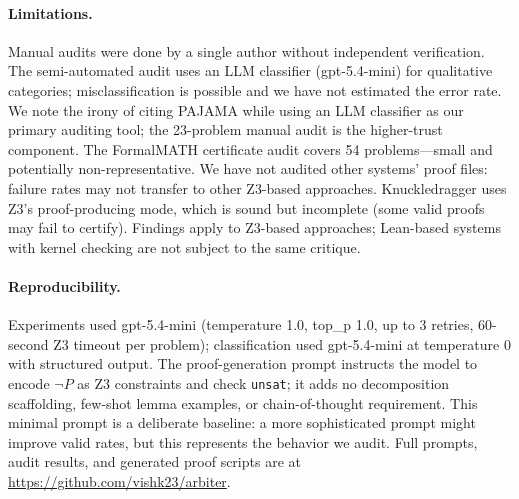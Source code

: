 \documentclass[11pt]{article}
\begin{document}
\paragraph{Limitations.} Manual audits were done by a single author without independent verification. The semi-automated audit uses an LLM classifier (gpt-5.4-mini) for qualitative categories; misclassification is possible and we have not estimated the error rate. We note the irony of citing PAJAMA while using an LLM classifier as our primary auditing tool; the 23-problem manual audit is the higher-trust component. The FormalMATH certificate audit covers 54 problems---small and potentially non-representative. We have not audited other systems' proof files: failure rates may not transfer to other Z3-based approaches. Knuckledragger uses Z3's proof-producing mode, which is sound but incomplete (some valid proofs may fail to certify). Findings apply to Z3-based approaches; Lean-based systems with kernel checking are not subject to the same critique.

\paragraph{Reproducibility.} Experiments used gpt-5.4-mini (temperature 1.0, top\_p 1.0, up to 3 retries, 60-second Z3 timeout per problem); classification used gpt-5.4-mini at temperature 0 with structured output. The proof-generation prompt instructs the model to encode $\neg P$ as Z3 constraints and check \texttt{unsat}; it adds no decomposition scaffolding, few-shot lemma examples, or chain-of-thought requirement. This minimal prompt is a deliberate baseline: a more sophisticated prompt might improve valid rates, but this represents the behavior we audit. Full prompts, audit results, and generated proof scripts are at \url{https://github.com/vishk23/arbiter}.
\end{document}
